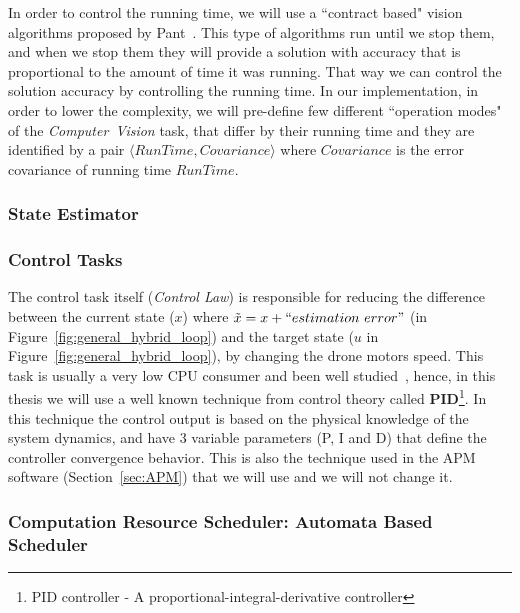 \documentclass[11pt]{article}
\begin{document}
In order to control the running time, we will use a ``contract based" vision algorithms proposed by Pant~\cite{UPenn-Pant}.
This type of algorithms run until we stop them, and when we stop them they will provide a solution with accuracy that is proportional to the amount of time it was running. That way we can control the solution accuracy by controlling the running time.
In our implementation, in order to lower the complexity, we will pre-define few different ``operation modes" of the \textit{Computer~Vision} task, that differ by their running time and they are identified by a pair $\langle RunTime, Covariance \rangle$ where $Covariance$ is the error covariance of running time $RunTime$.

\subsubsection{State Estimator}
\label{sec:estimator}

\subsubsection{Control Tasks}
\label{sec:control}
The control task itself (\textit{Control Law}) is responsible for reducing the difference between the current state ($x$) where $\tilde{x} = x+ ``estimation~error"$ (in Figure~\ref{fig:general_hybrid_loop}) and the target state ($u$ in Figure~\ref{fig:general_hybrid_loop}), by changing the drone motors speed.
This task is usually a very low CPU consumer and been well studied~\cite{PID}, hence, in this thesis we will use a well known technique from control theory called {\textbf{PID}\footnote{PID controller - A proportional-integral-derivative controller}}. 
In this technique the control output is based on the physical knowledge of the system dynamics, and have 3 variable parameters (P, I and D) that define the controller convergence behavior. 
This is also the technique used in the APM software (Section~\ref{sec:APM}) that we will use and we will not change it.

\subsubsection{Computation Resource Scheduler: Automata Based Scheduler}
\label{sec:scheduler}
\end{document}
